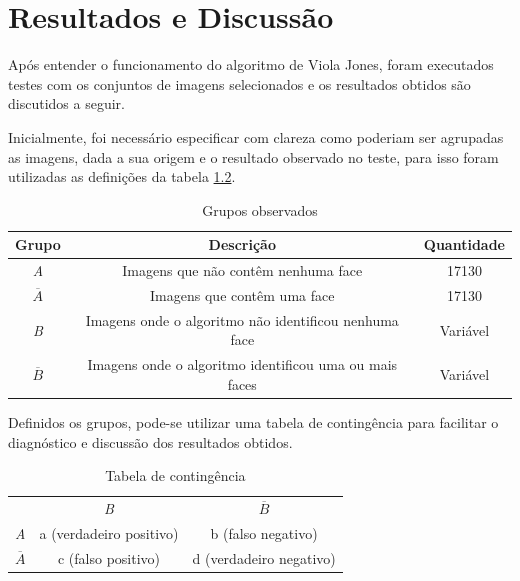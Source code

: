\chapter{Resultados e Discussão}\label{cap:resultados}

Após entender o funcionamento do algoritmo de Viola Jones, foram executados testes com os conjuntos de imagens selecionados e os resultados obtidos são discutidos a seguir.

Inicialmente, foi necessário especificar com clareza como poderiam ser agrupadas as imagens, dada a sua origem e o resultado observado no teste, para isso foram utilizadas as definições da tabela \ref{grupos-images}. 

\begin{table}[htbp]
    \caption{Grupos observados}
    \label{grupos-images}
    \centering
    \begin{tabular}{ccc}\hline\hline
        \textbf{Grupo} & \textbf{Descrição} & \textbf{Quantidade} \\\hline
        \textit{A} & Imagens que não contêm nenhuma face & 17130 \\
        $\overline{A}$ & Imagens que contêm uma face & 17130 \\
        \textit{B} & Imagens onde o algoritmo não identificou nenhuma face & Variável \\
        $\overline{B}$ & Imagens onde o algoritmo identificou uma ou mais faces & Variável \\
    \hline\hline
    \end{tabular}
\end{table}

Definidos os grupos, pode-se utilizar uma tabela de contingência para facilitar o diagnóstico e discussão dos resultados obtidos.

\begin{table}[htbp]
    \caption{Tabela de contingência}
    \label{grupos-images}
    \centering
    \begin{tabular}{ccc}\hline\hline
        & \textit{B} & $\overline{B}$ \\
    \textit{A} & a (verdadeiro positivo) & b (falso negativo) \\
    $\overline{A}$ & c (falso positivo) & d (verdadeiro negativo) \\
    \hline\hline
    \end{tabular}
\end{table}

